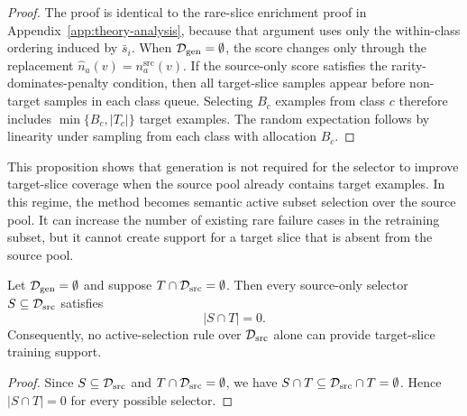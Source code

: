 \begin{tcolorbox}[
    colback=green!2!white,
    colframe=green!20!white,
    arc=3pt,
    boxrule=1pt,
    drop shadow,
    breakable
]
\begin{proof}
The proof is identical to the rare-slice enrichment proof in Appendix~\ref{app:theory-analysis}, because that argument uses only the within-class ordering induced by $\bar{s}_i$. When $\mathcal{D}_{\mathrm{gen}}=\emptyset$, the score changes only through the replacement $\hat{n}_a(v)=n_a^{\mathrm{src}}(v)$. If the source-only score satisfies the rarity-dominates-penalty condition, then all target-slice samples appear before non-target samples in each class queue. Selecting $B_c$ examples from class $c$ therefore includes $\min\{B_c,|T_c|\}$ target examples. The random expectation follows by linearity under sampling from each class with allocation $B_c$.
\end{proof}
\end{tcolorbox}

This proposition shows that generation is not required for the selector to improve target-slice coverage when the source pool already contains target examples. In this regime, the method becomes semantic active subset selection over the source pool. It can increase the number of existing rare failure cases in the retraining subset, but it cannot create support for a target slice that is absent from the source pool.

\begin{tcolorbox}[
    colback=blue!2!white,
    colframe=blue!20!white,
    arc=3pt,
    boxrule=1pt,
    drop shadow,
    breakable
]
\begin{proposition}
Let $\mathcal{D}_{\mathrm{gen}}=\emptyset$ and suppose $T\cap\mathcal{D}_{\mathrm{src}}=\emptyset$. Then every source-only selector $S\subseteq\mathcal{D}_{\mathrm{src}}$ satisfies
\begin{equation}
|S\cap T|=0.
\end{equation}
Consequently, no active-selection rule over $\mathcal{D}_{\mathrm{src}}$ alone can provide target-slice training support.
\end{proposition}
\end{tcolorbox}

\begin{tcolorbox}[
    colback=green!2!white,
    colframe=green!20!white,
    arc=3pt,
    boxrule=1pt,
    drop shadow,
    breakable
]
\begin{proof}
Since $S\subseteq\mathcal{D}_{\mathrm{src}}$ and $T\cap\mathcal{D}_{\mathrm{src}}=\emptyset$, we have $S\cap T\subseteq\mathcal{D}_{\mathrm{src}}\cap T=\emptyset$. Hence $|S\cap T|=0$ for every possible selector.
\end{proof}
\end{tcolorbox}


